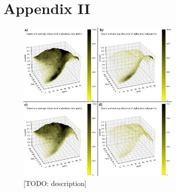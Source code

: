 \chapter*{Appendix II}

\begin{figure}[H]
  \centering
  \includegraphics[width=0.7\textwidth]{figures/appendix/stacking_sampling.png}
  \caption{\label{fig:appendix/stacking_sampling} [TODO: description]}
\end{figure}
